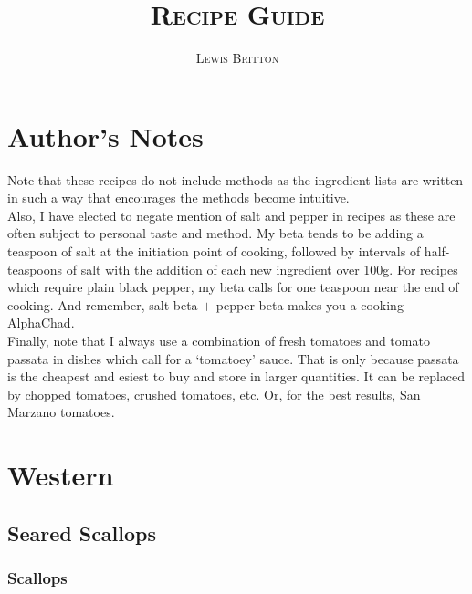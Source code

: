 \documentclass[11pt, english]{article}
\begin{document}

	\title{\huge\textsc{Recipe Guide}}
	\author{\Large\textsc{Lewis Britton}}
	\date{}
	\maketitle

	\renewcommand{\contentsname}{Table of Contents}

	\tableofcontents

\newpage


\section{Author's Notes}

	Note that these recipes do not include methods as the ingredient lists are written in such a way that encourages the methods become intuitive.\\

	Also, I have elected to negate mention of salt and pepper in recipes as these are often subject to personal taste and method. My beta tends to be adding a teaspoon of salt at the initiation point of cooking, followed by intervals of half-teaspoons of salt with the addition of each new ingredient over 100g. For recipes which require plain black pepper, my beta calls for one teaspoon near the end of cooking. And remember, salt beta $+$ pepper beta makes you a cooking AlphaChad.\\

	Finally, note that I always use a combination of fresh tomatoes and tomato passata in dishes which call for a `tomatoey' sauce. That is only because passata is the cheapest and esiest to buy and store in larger quantities. It can be replaced by chopped tomatoes, crushed tomatoes, etc. Or, for the best results, San Marzano tomatoes.

\newpage

\section{Western}

	\subsection{Seared Scallops}

		\subsubsection*{Scallops}
\end{document}

